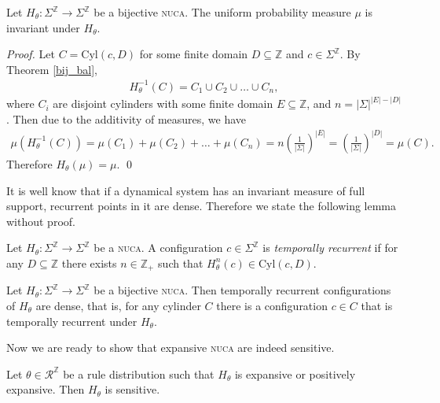 \documentclass[runningheads]{llncs}
\newcommand{\Z}{\mathbb{Z}}
\newcommand{\cyl}{\mathrm{Cyl}}
\begin{document}
\begin{lemma}
Let $H_\theta:\Sigma^\Z \rightarrow \Sigma^\Z$ be a bijective \textsc{nuca}. The uniform probability measure $\mu$ is invariant under $H_\theta$.
\end{lemma}

\begin{proof}
Let $C = \cyl (c, D)$ for some finite domain $D \subseteq \Z$ and $c \in \Sigma^\Z$. By Theorem \ref{bij_bal},
\begin{align*}
H_\theta^{-1} (C) = C_1 \cup C_2 \cup \ldots \cup C_n,
\end{align*}
where $C_i$ are disjoint cylinders with some finite domain $E \subseteq \Z$, and $n=|\Sigma|^{|E|-|D|}$. Then due to the additivity of measures, \cite{ergodic}
we have
\begin{align*}
\mu (H_\theta^{-1} (C) ) = \mu (C_1) + \mu (C_2) + \ldots + \mu(C_n) = n \left( \frac{1}{|\Sigma|} \right)^{|E|} = \left( \frac{1}{|\Sigma|} \right)^{|D|} = \mu (C).
\end{align*}
Therefore $H_\theta (\mu) = \mu$.
\qed
\end{proof}

It is well know that if a dynamical system has an invariant measure of full support, recurrent points in it are dense. Therefore we state the following lemma without proof. \cite{ergodic}

\begin{definition}
Let $H_\theta:\Sigma^\Z \rightarrow \Sigma^\Z$ be a \textsc{nuca}. A configuration $c \in \Sigma^\Z$ is \emph{temporally recurrent} if for any $D \subseteq \Z$ there exists $n\in \Z_+$ such that $H_\theta^n (c) \in \cyl (c,D)$.
\end{definition}

\begin{lemma}[Poincaré]\label{poincare}
Let $H_\theta:\Sigma^\Z \rightarrow \Sigma^\Z$ be a bijective \textsc{nuca}. Then temporally recurrent configurations of $H_\theta$ are dense, that is, for any cylinder $C$ there is a configuration $c \in C$ that is temporally recurrent under $H_\theta$. 
\end{lemma}

Now we are ready to show that expansive \textsc{nuca} are indeed sensitive.

\begin{theorem}
Let $\theta \in \mathcal{R}^\Z$ be a rule distribution such that $H_\theta$ is expansive or positively expansive. Then $H_\theta$ is sensitive.
\end{theorem}
\end{document}
